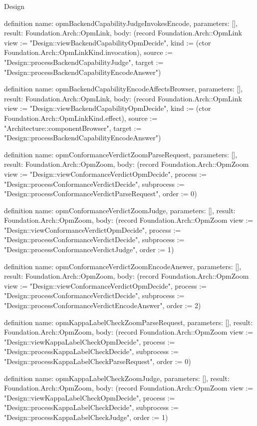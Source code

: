 \begin{lexlean}{Design}
\begin{semanticmodule}
definition{
  name: opmBackendCapabilityJudgeInvokesEncode,
  parameters: [],
  result: Foundation.Arch::OpmLink,
  body: (record Foundation.Arch::OpmLink {view := "Design::viewBackendCapabilityOpmDecide", kind := (ctor Foundation.Arch::OpmLinkKind.invocation), source := "Design::processBackendCapabilityJudge", target := "Design::processBackendCapabilityEncodeAnswer"})
}

definition{
  name: opmBackendCapabilityEncodeAffectsBrowser,
  parameters: [],
  result: Foundation.Arch::OpmLink,
  body: (record Foundation.Arch::OpmLink {view := "Design::viewBackendCapabilityOpmDecide", kind := (ctor Foundation.Arch::OpmLinkKind.effect), source := "Architecture::componentBrowser", target := "Design::processBackendCapabilityEncodeAnswer"})
}

definition{
  name: opmConformanceVerdictZoomParseRequest,
  parameters: [],
  result: Foundation.Arch::OpmZoom,
  body: (record Foundation.Arch::OpmZoom {view := "Design::viewConformanceVerdictOpmDecide", process := "Design::processConformanceVerdictDecide", subprocess := "Design::processConformanceVerdictParseRequest", order := 0})
}

definition{
  name: opmConformanceVerdictZoomJudge,
  parameters: [],
  result: Foundation.Arch::OpmZoom,
  body: (record Foundation.Arch::OpmZoom {view := "Design::viewConformanceVerdictOpmDecide", process := "Design::processConformanceVerdictDecide", subprocess := "Design::processConformanceVerdictJudge", order := 1})
}

definition{
  name: opmConformanceVerdictZoomEncodeAnswer,
  parameters: [],
  result: Foundation.Arch::OpmZoom,
  body: (record Foundation.Arch::OpmZoom {view := "Design::viewConformanceVerdictOpmDecide", process := "Design::processConformanceVerdictDecide", subprocess := "Design::processConformanceVerdictEncodeAnswer", order := 2})
}

definition{
  name: opmKappaLabelCheckZoomParseRequest,
  parameters: [],
  result: Foundation.Arch::OpmZoom,
  body: (record Foundation.Arch::OpmZoom {view := "Design::viewKappaLabelCheckOpmDecide", process := "Design::processKappaLabelCheckDecide", subprocess := "Design::processKappaLabelCheckParseRequest", order := 0})
}

definition{
  name: opmKappaLabelCheckZoomJudge,
  parameters: [],
  result: Foundation.Arch::OpmZoom,
  body: (record Foundation.Arch::OpmZoom {view := "Design::viewKappaLabelCheckOpmDecide", process := "Design::processKappaLabelCheckDecide", subprocess := "Design::processKappaLabelCheckJudge", order := 1})
}


\end{semanticmodule}
\end{lexlean}
